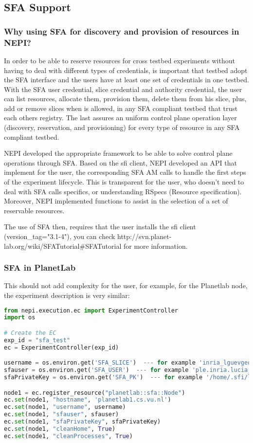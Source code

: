 \subsection{SFA Support}

\subsubsection{Why using SFA for discovery and provision of resources in NEPI?}

In order to be able to reserve resources for cross testbed experiments without having to deal with different types of credentials, is important that testbed adopt the SFA interface and the users have at least one set of credentials in one testbed. With the SFA user credential, slice credential and authority credential, the user can list resources, allocate them, provision them, delete them from his slice, plus, add or remove slices when is allowed, in any SFA compliant testbed that trust each others registry. The last assures an uniform control plane operation layer (discovery, reservation, and provisioning) for every type of resource in any SFA compliant testbed.

NEPI developed the appropriate framework to be able to solve control plane operations through SFA. Based on the sfi client, NEPI developed an API that implement for the user, the corresponding SFA AM calls to handle the first steps of the experiment lifecycle. This is transparent for the user, who doesn't need to deal with SFA calls specifics, or understanding RSpecs (Resource specification). Moreover, NEPI implemented functions to assist in the selection of a set of reservable resources.

The use of SFA then, requires that the user installs the sfi client (version\_tag="3.1-4"), you can check http://svn.planet-lab.org/wiki/SFATutorial\#SFATutorial for more information. 

\subsubsection{SFA in PlanetLab}

This should not add complexity for the user, for example, for the Planetlab node, the experiment description is very similar:
\begin{lstlisting}[language=Python]
from nepi.execution.ec import ExperimentController
import os

# Create the EC
exp_id = "sfa_test"
ec = ExperimentController(exp_id)

username = os.environ.get('SFA_SLICE')  --- for example 'inria_lguevgeo'
sfauser = os.environ.get('SFA_USER')  --- for example 'ple.inria.lucia_guevgeozian_odizzio'
sfaPrivateKey = os.environ.get('SFA_PK')  --- for example '/home/.sfi/lucia_guevgeozian_odizzio.pkey'

node1 = ec.register_resource("planetlab::sfa::Node")
ec.set(node1, "hostname", 'planetlab1.cs.vu.nl')
ec.set(node1, "username", username)
ec.set(node1, "sfauser", sfauser)
ec.set(node1, "sfaPrivateKey", sfaPrivateKey)
ec.set(node1, "cleanHome", True)
ec.set(node1, "cleanProcesses", True)
\end{lstlisting}
